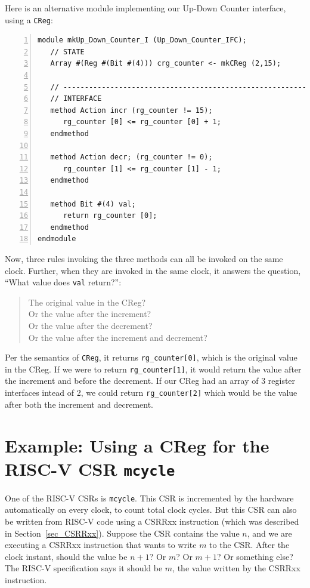 Here is an alternative module implementing our Up-Down Counter
interface, using a \verb|CReg|:

{\footnotesize
\begin{Verbatim}[frame=single, numbers=left]
module mkUp_Down_Counter_I (Up_Down_Counter_IFC);
   // STATE
   Array #(Reg #(Bit #(4))) crg_counter <- mkCReg (2,15);

   // ----------------------------------------------------------------
   // INTERFACE
   method Action incr (rg_counter != 15);
      rg_counter [0] <= rg_counter [0] + 1;
   endmethod

   method Action decr; (rg_counter != 0);
      rg_counter [1] <= rg_counter [1] - 1;
   endmethod

   method Bit #(4) val;
      return rg_counter [0];
   endmethod
endmodule
\end{Verbatim}
}

Now, three rules invoking the three methods can all be invoked on the
same clock.  Further, when they are invoked in the same clock, it
answers the question, ``What value does \verb|val| return?'':

\begin{quote}
The original value in the CReg? \\
Or the value after the increment? \\
Or the value after the decrement? \\
Or the value after the increment and decrement?
\end{quote}

Per the semantics of \verb|CReg|, it returns \verb|rg_counter[0]|,
which is the original value in the CReg.  If we were to return
\verb|rg_counter[1]|, it would return the value after the increment
and before the decrement.  If our CReg had an array of 3 register
interfaces intead of 2, we could return \verb|rg_counter[2]| which
would be the value after both the increment and decrement.


\section{Example: Using a CReg for the RISC-V CSR {\tt mcycle}}

\label{Sec_CSR_mcycle}

One of the RISC-V CSRs is {\tt mcycle}.  This CSR is incremented by
the hardware automatically on every clock, to count total clock
cycles.  But this CSR can also be written from RISC-V code using a
CSRRxx instruction (which was described in Section~\ref{sec_CSRRxx}).
Suppose the CSR contains the value $n$, and we are executing a CSRRxx
instruction that wants to write $m$ to the CSR.  After the clock
instant, should the value be $n+1$? Or $m$? Or $m+1$? Or something
else?  The RISC-V specification says it should be $m$, the value
written by the CSRRxx instruction.

